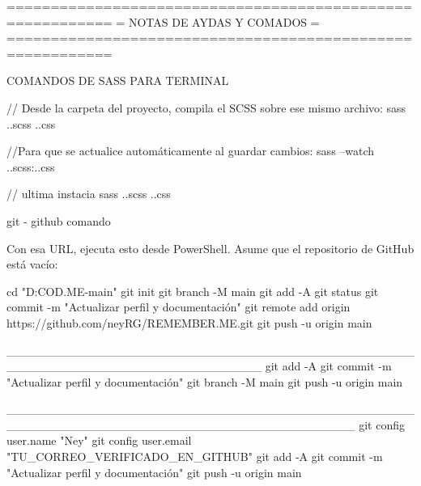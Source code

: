 
==========================================================
=              NOTAS DE AYDAS Y COMADOS                  =
==========================================================
          



 COMANDOS DE SASS PARA TERMINAL 

 // Desde la carpeta del proyecto, compila el SCSS sobre ese mismo archivo:
sass .\sass\main.scss .\style\style.css

//Para que se actualice automáticamente al guardar cambios:
sass --watch .\sass\main.scss:.\style\style.css

// ultima instacia 
sass .\sass\main.scss .\style\style.css

git - github comando 

Con esa URL, ejecuta esto desde PowerShell. Asume que el repositorio de GitHub está vacío:

cd "D:\VS COD\REMEMBER.ME-main"
git init
git branch -M main
git add -A
git status
git commit -m "Actualizar perfil y documentación"
git remote add origin https://github.com/neyRG/REMEMBER.ME.git
git push -u origin main

______________________________________________________________________________
git add -A
git commit -m "Actualizar perfil y documentación"
git branch -M main
git push -u origin main

_________________________________________________________________________________________
git config user.name "Ney"
git config user.email "TU_CORREO_VERIFICADO_EN_GITHUB"
git add -A
git commit -m "Actualizar perfil y documentación"
git push -u origin main